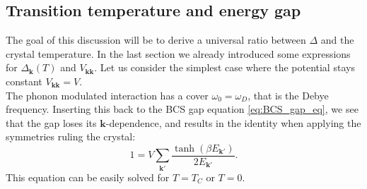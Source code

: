 \documentclass[../main.tex]{subfile}
\begin{document}
\subsection{Transition temperature and energy gap}
The goal of this discussion will be to derive a universal ratio between $\Delta$ and the crystal temperature. In the last section 
we already introduced some expressions for $\Delta_{\bm{k}}(T)$ and $V_{\bm{k}\bm{k}}$. Let us consider the simplest case where the potential stays constant $V_{\bm{k}\bm{k}} = V$.\\

The phonon modulated interaction has a cover $\omega_0 = \omega_D$, that is the Debye frequency. Inserting this back to the BCS gap equation 
\ref{eq:BCS_gap_eq}, we see that the gap loses its $\bm{k}$-dependence, and results in the identity when applying the symmetries
ruling the crystal:
\begin{equation*}
    1 = V\sum_{\bm{k}'} \frac{\tanh\left(\beta E_{\bm{k}'}\right)}{2 E_{\bm{k}'}}.
\end{equation*}
This equation can be easily solved for $T=T_C$ or $T = 0$.
\end{document}
